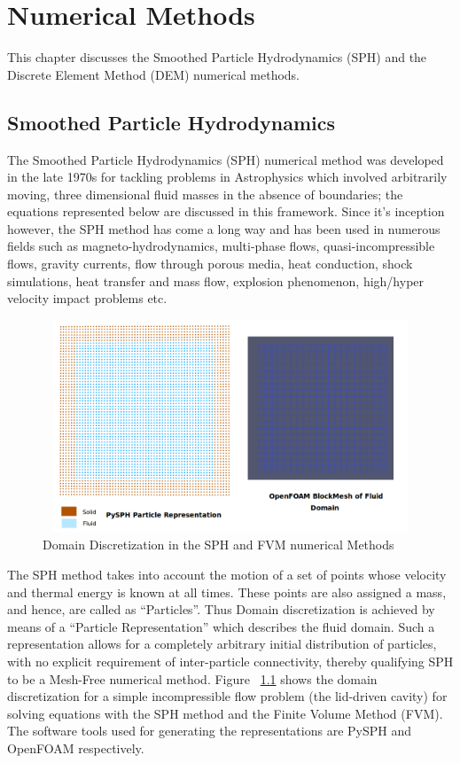 \chapter{Numerical Methods}
%

This chapter discusses the Smoothed Particle Hydrodynamics (SPH) and the Discrete Element Method (DEM) numerical methods.

\section{Smoothed Particle Hydrodynamics}

The Smoothed Particle Hydrodynamics (SPH) numerical method was developed in the late 1970s \cite{gingold_monaghan} for tackling problems in Astrophysics which involved arbitrarily moving, three dimensional fluid masses in the absence of boundaries; the equations represented below are discussed in this framework. Since it's inception however, the SPH method has come a long way and has been used in numerous fields such as magneto-hydrodynamics, multi-phase flows, quasi-incompressible flows, gravity currents, flow through porous media, heat conduction, shock simulations, heat transfer and mass flow, explosion phenomenon, high/hyper velocity impact problems etc.

\begin{figure}[htb!]
\centering
\setlength\fboxsep{0pt}
      \includegraphics[width=5in, height=2.5in]{figures/particle_rep.png}
\caption{{\small{Domain Discretization in the SPH and FVM numerical Methods}}}
\label{fig:particle_representation}
\end{figure}

The SPH method takes into account the motion of a set of points whose velocity and thermal energy is known at all times. These points are also assigned a mass, and hence, are called as ``Particles''.\cite{monaghan_intro} Thus Domain discretization is achieved by means of a ``Particle Representation'' which describes the fluid domain. Such a representation allows for a completely arbitrary initial distribution of particles, with no explicit requirement of inter-particle connectivity, thereby qualifying SPH to be a Mesh-Free numerical method. Figure ~\ref{fig:particle_representation} shows the domain discretization for a simple incompressible flow problem (the lid-driven cavity) for solving equations with the SPH method and the Finite Volume Method (FVM). The software tools used for generating the representations are PySPH \cite{prabhu_puri} and OpenFOAM respectively.


